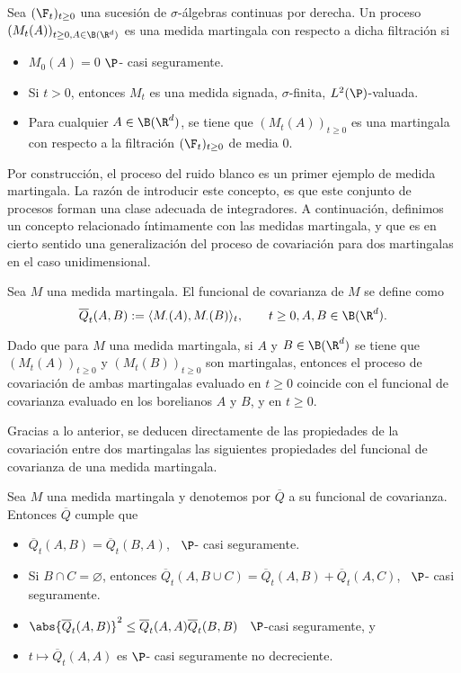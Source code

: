 \begin{dfn} 
Sea $(\F_t)_{t\geq0}$ una sucesión de $\sigma$-álgebras continuas por derecha. Un proceso $(M_t(A))_{t\geq0, A\in \B(\R^{d})}$ es una medida martingala con respecto a dicha filtración si 
\begin{itemize}
   \item $M_0(A)=0$ $\P$- casi seguramente.
   \item Si $t>0$, entonces $M_t$ es una medida signada, $\sigma$-finita, $L^{2}(\P)$-valuada.
   \item Para cualquier $A\in \B(\R^{d})$, se tiene que $(M_t(A))_{t\geq0}$ es una martingala con respecto a la filtración $(\F_t)_{t\geq0}$ de media 0.
\end{itemize}
\end{dfn}
Por construcción, el proceso del ruido blanco es un primer ejemplo de medida martingala. La razón de introducir este concepto, es que este conjunto de procesos forman una clase adecuada de integradores. A continuación, definimos un concepto relacionado íntimamente con las medidas martingala, y que es en cierto sentido una generalización del proceso de covariación para dos martingalas en el caso unidimensional.

\begin{dfn} 
 Sea $M$ una medida martingala. El funcional de covarianza de $M$ se define como
 \[
 \overline{Q}_t(A,B):= \langle M_\cdot(A),M_\cdot (B)\rangle_t, \qquad t\geq 0, A, B \in \B(\R^{d}). 
 \]
 \end{dfn}
 Dado que para $M$ una medida martingala, si $A$ y $B \in \B(\R^{d})$ se tiene que $(M_t(A))_{t\geq0}$ y $(M_t(B))_{t\geq0}$ son martingalas, entonces el proceso de covariación de ambas martingalas evaluado en $t\geq0$ coincide con el funcional de covarianza evaluado en los borelianos $A$ y $B$, y en $t\geq0$.

 Gracias a lo anterior, se deducen directamente de las propiedades de la covariación entre dos martingalas las siguientes propiedades del funcional de covarianza de una medida martingala.

 \begin{prop} 
  Sea $M$ una medida martingala y denotemos por $\overline{Q}$ a su funcional de covarianza. Entonces $\overline{Q}$ cumple que
  \begin{itemize}
   \item $\overline{Q}_t(A,B)=\overline{Q}_t(B,A)$, \ $\P$- casi seguramente.
   \item Si $B\cap C=\varnothing$, entonces $\overline{Q}_t(A,B\cup C)=\overline{Q}_t(A,B)+\overline{Q}_t(A,C)$, \ $\P$- casi seguramente.
   \item $\abs{\overline{Q}_t(A,B)}^2\leq \overline{Q}_t(A,A)\overline{Q}_t(B,B)$ \ $\P$-casi seguramente, y 
   \item $t\mapsto\overline{Q}_t(A,A)$ es $\P$- casi seguramente no decreciente.
  \end{itemize}
  \end{prop}

